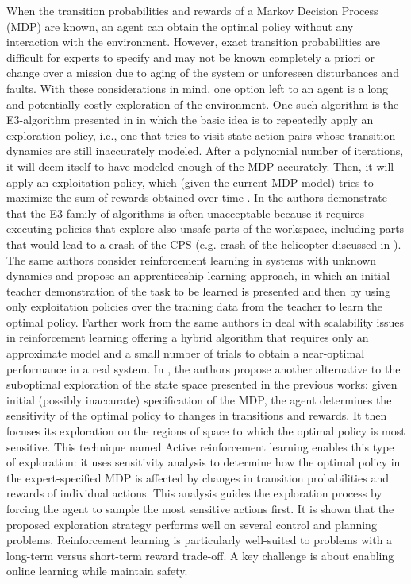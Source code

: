 When the transition probabilities and rewards of a Markov Decision Process (MDP) are known, an agent can obtain the optimal policy without any interaction with the environment. However, exact transition probabilities are difficult for experts to specify and may not be known completely a priori or change over a mission due to aging of the system or unforeseen disturbances and faults. With these considerations in mind, one option left to an agent is a long and potentially costly exploration of the environment. One such algorithm is the E3-algorithm presented in \cite{kearns2002near} in which the basic idea is to repeatedly apply an exploration policy, i.e., one that tries to visit state-action pairs whose transition dynamics are still inaccurately modeled. After a polynomial number of iterations, it will deem itself to have modeled enough of the MDP accurately. Then, it will apply an exploitation policy, which (given the current MDP model) tries to maximize the sum of rewards obtained over time 
. 
In \cite{abbeel2005exploration} the authors demonstrate that the E3-family of algorithms \cite{kearns2002near} is often unacceptable because it requires executing policies that explore also unsafe parts of the workspace, including parts that would lead to a crash of the CPS (e.g. crash of the helicopter discussed in \cite{abbeel2005exploration}). The same authors consider reinforcement learning in systems with unknown dynamics and propose an apprenticeship learning approach, in which an initial teacher demonstration of the task to be learned is presented and then by using only exploitation policies over the training data from the teacher to learn the optimal policy. Farther work from the same authors in \cite{abbeel2006using} deal with scalability issues in reinforcement learning offering a hybrid algorithm that requires only an approximate model and a small number of trials to obtain a near-optimal performance in a real system.
In \cite{epshteyn2008active}, the authors propose another alternative to the suboptimal exploration of the state space presented in the previous works: given initial (possibly inaccurate) specification of the MDP, the agent determines the sensitivity of the optimal policy to changes in transitions and rewards. It then focuses its exploration on the regions of space to which the optimal policy is most sensitive. This technique named Active reinforcement learning enables this type of exploration: it uses sensitivity analysis to determine how the optimal policy in the expert-specified MDP is affected by changes in transition probabilities and rewards of individual actions. This analysis guides the exploration process by forcing the agent to sample the most sensitive actions first. It is shown that the proposed exploration strategy performs well on several control and planning problems.
Reinforcement learning is particularly well-suited to problems with a long-term versus short-term reward trade-off. A key challenge is about enabling online learning while maintain safety.

